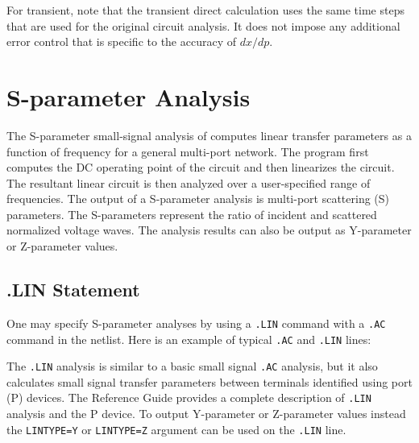 For transient, note that the transient direct calculation uses the
same time steps that are used for the original circuit analysis.  It
does not impose any additional error control that is specific to the
accuracy of $dx/dp$.


\section{S-parameter Analysis}
\label{SP_Analysis}
\label{SP_Sweep_Overview}
  
 

The S-parameter small-signal analysis of \Xyce{} computes linear
transfer parameters as a function of frequency for a general
multi-port network. The program first computes the DC operating point
of the circuit and then linearizes the circuit. The resultant linear
circuit is then analyzed over a user-specified range of
frequencies. The output of a S-parameter analysis is multi-port
scattering (S) parameters. The S-parameters represent the ratio of
incident and scattered normalized voltage waves.  The analysis results
can also be output as Y-parameter or Z-parameter values.

\subsection{.LIN Statement}

One may specify S-parameter analyses by using a \verb|.LIN| command with a \verb|.AC| command in the netlist.
Here is an example of typical \verb|.AC| and \verb|.LIN| lines:


The \verb|.LIN| analysis is similar to a basic small signal \verb|.AC|
analysis, but it also calculates small signal transfer parameters
between terminals identified using port (P) devices. The \Xyce{}
Reference Guide\ReferenceGuide{} provides a complete description of
\verb|.LIN| analysis and the P device.  To output Y-parameter or
Z-parameter values instead the \texttt{LINTYPE=Y} or
\texttt{LINTYPE=Z} argument can be used on the \texttt{.LIN} line.

